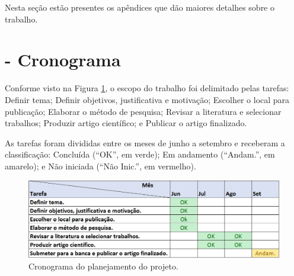 \documentclass[smallextended]{svjour3}
\begin{document}
	\begin{appendices}
		
		Nesta seção estão presentes os apêndices que dão maiores detalhes sobre o trabalho.
		
		\section{- Cronograma}
			Conforme visto na Figura \ref{fig:cronograma}, o escopo do trabalho foi delimitado pelas tarefas: Definir tema; Definir objetivos, justificativa e motivação; Escolher o local para publicação; Elaborar o método de pesquisa; Revisar a literatura e selecionar trabalhos; Produzir artigo científico; e Publicar o artigo finalizado. 
			
			As tarefas foram divididas entre os meses de junho a setembro e receberam a classificação: Concluída (“OK”, em verde); Em andamento (“Andam.”, em amarelo); e Não iniciada (“Não Inic.”, em vermelho). 
			
			\begin{figure}[!ht]
				\centering
				\includegraphics[width=1\textwidth]{imagens/cronogramaFINAL.jpg}
				\caption{Cronograma do planejamento do projeto.}
				\label{fig:cronograma}
			\end{figure}
	\end{appendices}
	
\end{document}
